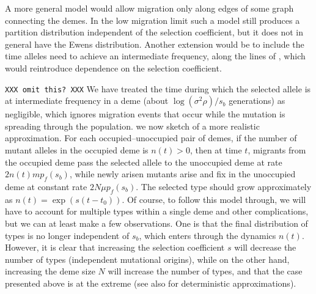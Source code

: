 \documentclass{article}
\begin{document}
A more general model would allow migration only along edges of some graph connecting the demes.
In the low migration limit such a model still produces a partition distribution independent of the selection coefficient,
but it does not in general have the Ewens distribution.
Another extension would be to include the time alleles need to achieve an intermediate frequency,
along the lines of \citet{Navarro:03}, which would reintroduce dependence on the selection coefficient.

\texttt{XXX omit this? XXX}
We have treated the time during which the selected allele is at intermediate frequency in a deme (about $\log(\sigma^2 \rho)/s_b$ generations) as negligible, 
which ignores migration events that occur while the mutation is spreading through the population. 
we now sketch of a more realistic approximation.
For each occupied--unoccupied pair of demes, if the number of mutant alleles in the occupied deme is $n(t)>0$,
then at time $t$, migrants from the occupied deme pass the selected allele to the unoccupied deme at rate $2 n(t) m p_f(s_b)$,
while newly arisen mutants arise and fix in the unoccupied deme at constant rate $2 N \mu p_f(s_b)$.
The selected type should grow approximately as $n(t)=\exp(s(t-t_0))$.
Of course, to follow this model through, we will have to account for multiple types within a single deme and other complications,
but we can at least make a few observations.
One is that the final distribution of types is no longer independent of $s_b$, which enters through the dynamics $n(t)$.
However, it is clear that increasing the selection coefficient $s$ will decrease the number of types (independent mutational origins),
while on the other hand, increasing the deme size $N$ will increase the number of types,
and that the case presented above is at the extreme (see also \cite{Navarro:03} for deterministic approximations). 
\end{document}
